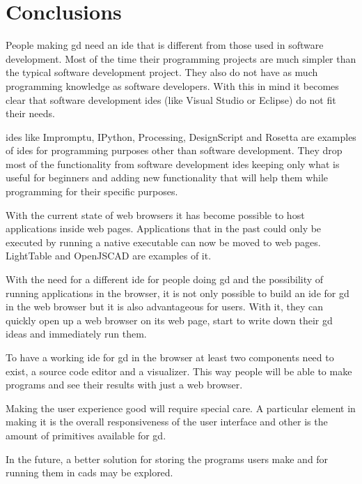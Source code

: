 \documentclass{./llncs2e/llncs}
\begin{document}
	

\section{Conclusions}
	People making \ac{gd} need an \ac{ide} that is different from those used in software development. 
	Most of the time their programming projects are much simpler than the typical software development project.
	They also do not have as much programming knowledge as software developers.
	With this in mind it becomes clear that software development \acp{ide} (like Visual Studio or Eclipse) do not fit their needs.
	
	\ac{ide}s like Impromptu, IPython, Processing, DesignScript and Rosetta are examples of \ac{ide}s for programming purposes other than software development.
	They drop most of the functionality from software development \ac{ide}s  keeping only what is useful for beginners and adding new functionality that will help them while programming for their specific purposes.
	
	With the current state of web browsers it has become possible to host applications inside web pages. 
	Applications that in the past could only be executed by running a native executable can now be moved to web pages.
	LightTable and OpenJSCAD are examples of it.
	
	With the need for a different \ac{ide} for people doing \ac{gd} and the possibility of running applications in the browser, it is not only possible to build an \ac{ide} for \ac{gd} in the web browser but it is also advantageous for users.
	With it, they can quickly open up a web browser on its web page, start to write down their \ac{gd} ideas and immediately run them.
	
	To have a working \ac{ide} for \ac{gd} in the browser at least two components need to exist, a source code editor and a visualizer.
	This way people will be able to make programs and see their results with just a web browser.
	
	Making the user experience good will require special care.
	A particular element in making it is the overall responsiveness of the user interface and other is the amount of primitives available for \ac{gd}.
	
	In the future, a better solution for storing the programs users make and for running them in \ac{cad}s may be explored.
	
	
\end{document}
